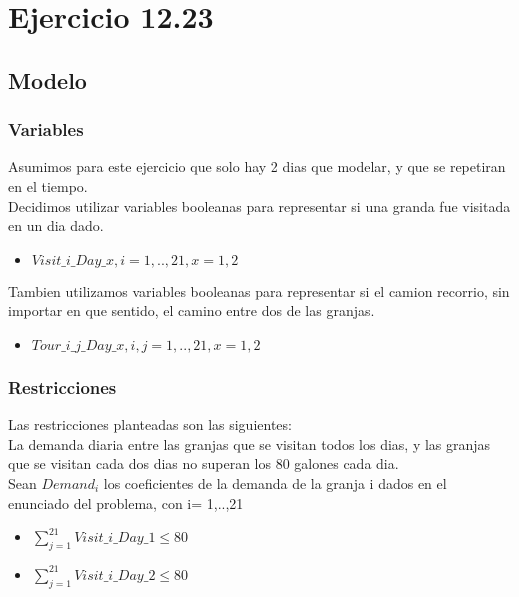 \section{Ejercicio 12.23}

\subsection{Modelo}

\subsubsection{Variables}


Asumimos para este ejercicio que solo hay 2 dias que modelar, y que se repetiran en el tiempo. \\

Decidimos utilizar variables booleanas para representar si una granda fue visitada en un dia dado. \\

\begin{itemize}
\item $Visit\_i\_Day\_x,  i = 1, .. ,21, x = 1,2$ \\
\end{itemize}

Tambien utilizamos variables booleanas para representar si el camion recorrio, sin importar en que sentido, el camino entre dos de las granjas. \\

\begin{itemize}
\item $Tour\_i\_j\_Day\_x,  i,j = 1, .. ,21, x = 1,2 $ \\
\end{itemize}

\subsubsection{Restricciones}

Las restricciones planteadas son las siguientes: \\

La demanda diaria entre las granjas que se visitan todos los dias, y las granjas que se visitan cada dos dias no superan los 80 galones cada dia.\\
Sean $Demand_i$ los coeficientes de la demanda de la granja i dados en el enunciado del problema, con i= 1,..,21 \\

\begin{itemize}
\item $\sum_{j=1}^{21} Visit\_i\_Day\_1 \leq 80$ \\
\item $\sum_{j=1}^{21} Visit\_i\_Day\_2 \leq 80$ \\
\end{itemize}


